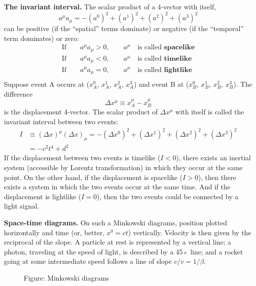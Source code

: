\documentclass[../../main.tex]{subfiles}
\begin{document}
\textbf{The invariant interval.} The scalar product of a 4-vector with itself,
\begin{equation*}
    a^\mu a_\mu  = -(a^0)^2 + (a^1)^2 + (a^2)^2 + (a^3)^2 
\end{equation*}
can be positive (if the “spatial” terms dominate) or negative (if the “temporal” term dominates) or zero:
\begin{align*}
    \text{If}\qquad a^\mu a_\mu>0,\qquad a^\mu\quad\text{is called }\textbf{spacelike}\\
    \text{If}\qquad a^\mu a_\mu<0,\qquad a^\mu\quad\text{is called }\textbf{timelike}\\
    \text{If}\qquad a^\mu a_\mu=0,\qquad a^\mu\quad\text{is called }\textbf{lightlike}\\
\end{align*}
Suppose event A occurs at ($x_A^0$, $x_A^1$, $x_A^2$, $x_A^3$) and event B at ($x_B^0$, $x_B^1$, $x_B^2$, $x_B^3$). The difference
\begin{equation*}
    \Delta x^\mu\equiv x_A^\mu-x_B^\mu
\end{equation*}
is the displacement 4-vector. The scalar product of $\Delta x^\mu$ with itself is called the invariant interval between two events:
\begin{align*}
    I&\equiv (\Delta x)^\mu(\Delta x)_\mu= -(\Delta x^0)^2 + (\Delta x^1)^2 + (\Delta x^2)^2 + (\Delta x^3)^2 \\
    &=-c^2t^4+d^2
\end{align*}
If the displacement between two events is timelike ($I < 0$), there exists an inertial system (accessible by Lorentz transformation) in which they occur at the same point. On the other hand, if the displacement is spacelike ($I > 0$), then there exists a system in which the two events occur at the same time. And if the displacement is lightlike ($I = 0$), then the two events could be connected by a light signal.

\textbf{Space-time diagrams.} On such a Minkowski diagrams, position plotted horizontally and time (or, better, $x^0 = ct$) vertically. Velocity is then given by the reciprocal of the slope. A particle at rest is represented by a vertical line; a photon, traveling at the speed of light, is described by a 45◦ line; and a rocket going at some intermediate speed follows a line of slope $c/v = 1/\beta$.
\begin{figure}
    \centering
    \caption*{Figure: Minkowski diagrams}
\end{figure}
\end{document}
